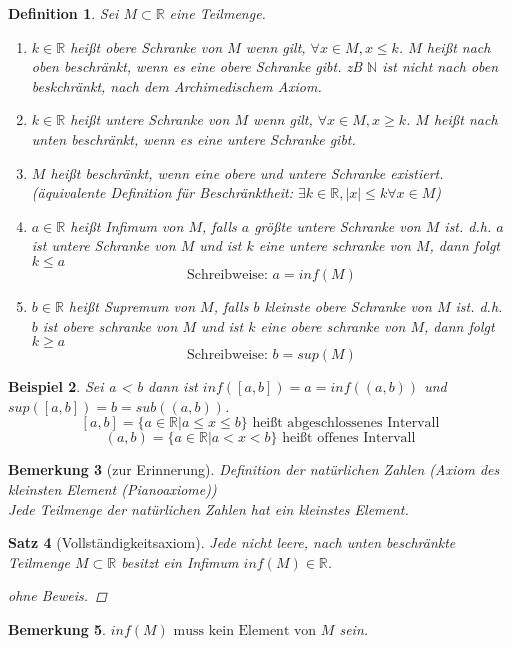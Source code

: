 \documentclass[a4paper,titlepage,oneside]{article}
\def\N{\ensuremath{\mathbb{N}} }
\def\R{\ensuremath{\mathbb{R}} }
\newcommand{\fa}[1]{\ensuremath{\forall#1}}
\theoremstyle{thmstyle}
\newtheorem{satz}{Satz}[subsection]
\newtheorem{defi}[satz]{Definition}
\newtheorem{bsp}[satz]{Beispiel}
\newtheorem{bem}[satz]{Bemerkung}
\begin{document}
\begin{defi}
Sei $ M \subset \R$ eine Teilmenge.\begin{enumerate}
\item $k \in \R $ heißt obere Schranke von $M$ wenn gilt, $\fa x \in M, x \le k$. $M$ heißt nach oben beschränkt, wenn es eine obere Schranke gibt.
zB $\N$ ist nicht nach oben beskchränkt, nach dem Archimedischem Axiom.
\item $k \in \R $ heißt untere Schranke von $M$ wenn gilt, $\fa x \in M, x \ge k$. $M$ heißt nach unten beschränkt, wenn es eine untere Schranke gibt.
\item $M$ heißt beschränkt, wenn eine obere und untere Schranke existiert. 
(äquivalente Definition für Beschränktheit: $\exists k \in \R , |x| \le k \fa x \in M$)
\item $a \in \R$ heißt Infimum von $M$, falls $a$ größte untere Schranke von $M$ ist. d.h. $a$ ist untere Schranke von $M$ und ist $k$ eine untere schranke von $M$, dann folgt $k \le a$
\[\text{Schreibweise: } a = inf(M)\]
\item $b \in \R$ heißt Supremum von $M$, falls $b$ kleinste obere Schranke von $M$ ist. d.h. $b$ ist obere schranke von $M$ und ist $k$ eine obere schranke von $M$, dann folgt $k \ge a$
\[\text{Schreibweise: } b = sup(M)\]
\end{enumerate}
\end{defi}

\begin{bsp}
Sei a < b dann ist $inf( [a,b] ) = a = inf( (a,b) )$ und $ sup( [a,b] ) = b = sub( (a,b) )$.
\[[a, b] = \{a \in \R | a \le x \le b\} \text{ heißt abgeschlossenes Intervall}\]
\[(a, b) = \{a \in \R | a < x < b\} \text{ heißt offenes Intervall}\]
\end{bsp}

\begin{bem}[zur Erinnerung]
Definition der natürlichen Zahlen (Axiom des kleinsten Element (Pianoaxiome)) \\
Jede Teilmenge der natürlichen Zahlen hat ein kleinstes Element.
\end{bem}

\begin{satz}[Vollständigkeitsaxiom]
Jede nicht leere, nach unten beschränkte Teilmenge $M \subset \R$  besitzt ein Infimum $inf(M) \in \R$.
\begin{proof}[ohne Beweis] \end{proof}
\end{satz}

\begin{bem}
$inf(M) \text{ muss kein Element von } M$ sein.
\end{bem}
\end{document}
